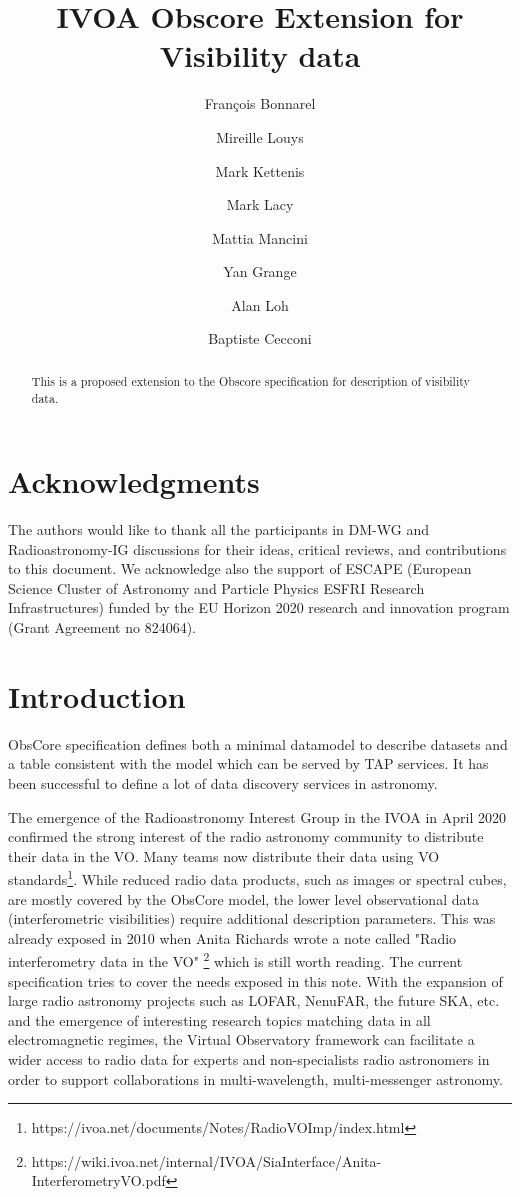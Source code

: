 \documentclass[11pt,a4paper]{ivoa}
\title{IVOA Obscore Extension for Visibility data}
\author{Fran\c cois Bonnarel}
\author{Mireille Louys}
\author{Mark Kettenis}
\author{Mark Lacy}
\author{Mattia Mancini}
\author{Yan Grange}
\author{Alan Loh}
\author{Baptiste Cecconi}
\begin{document}
\begin{abstract}
This is a proposed extension to the Obscore specification for description of visibility data.
\end{abstract}

\section*{Acknowledgments}

The authors would like to thank all the participants in DM-WG and Radioastronomy-IG discussions 
for their ideas, critical reviews, and contributions to this document.
We acknowledge also the support of ESCAPE (European Science Cluster of Astronomy
and Particle Physics ESFRI Research Infrastructures) funded by the EU Horizon
2020 research and innovation program (Grant Agreement no 824064).

\section{Introduction}


ObsCore specification \citep{std:OBSCORE} defines both a minimal datamodel to describe datasets 
and a table consistent with the model which can be served by TAP services. It has been successful 
to define a lot of data discovery services in astronomy.

The emergence of the Radioastronomy Interest Group in the IVOA in April 2020 confirmed the strong 
interest of the radio astronomy community to distribute their data in the VO. Many teams now 
distribute their data using VO standards\footnote{https://ivoa.net/documents/Notes/RadioVOImp/index.html}. 
While reduced radio data products, such as images or spectral cubes, %
are mostly covered by the ObsCore model, the lower level observational data 
(interferometric visibilities) require additional description parameters. This was already exposed 
in 2010 when Anita Richards wrote a note called "Radio interferometry data in the VO" 
\footnote{https://wiki.ivoa.net/internal/IVOA/SiaInterface/Anita-InterferometryVO.pdf} which is 
still worth reading. The current specification tries to cover the needs exposed in this note. 
With the expansion of large radio astronomy projects such as LOFAR, NenuFAR, the future SKA, etc. 
and the emergence of interesting research topics matching data in all electromagnetic regimes, the 
Virtual Observatory framework can facilitate a wider access to radio data for experts and 
non-specialists radio astronomers in order to support collaborations in multi-wavelength, 
multi-messenger astronomy. 
\end{document}

